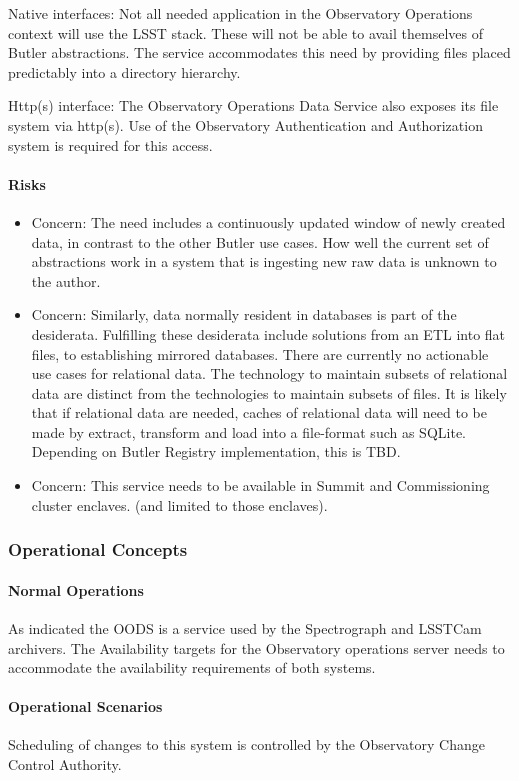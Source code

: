 Native interfaces: Not all needed application in the Observatory Operations context
will use the LSST stack. These will not be able to avail themselves of Butler abstractions.
The service accommodates this need by providing files placed predictably into a
directory hierarchy.

Http(s) interface: The Observatory Operations Data Service also exposes its
file system via http(s). Use of the Observatory Authentication and Authorization
system is required for this access.

\paragraph{Risks}

\begin{itemize}

\item Concern: The need includes a continuously updated window of newly created
data, in contrast to the other Butler use cases.  How well the current set of
abstractions work in a system that is ingesting new raw data  is unknown to the
author.

\item Concern: Similarly, data normally resident in databases is part of the desiderata.
Fulfilling these desiderata include solutions from an ETL into flat files, to
establishing mirrored databases. There are currently no actionable use cases
for relational data. The technology to maintain subsets of relational data are distinct
from the technologies to maintain subsets of files. It is likely that if relational data are
needed, caches of relational data will need to be made by extract, transform and load
into a file-format such as SQLite. Depending on Butler Registry implementation, this is TBD.  

\item Concern: This service needs to be available in Summit and Commissioning cluster enclaves. (and limited to those enclaves).

\end{itemize}

\subsubsection{Operational Concepts}

\paragraph{Normal Operations}

As indicated the OODS is a service used by the Spectrograph and LSSTCam archivers.
The Availability targets for the
Observatory operations server needs to accommodate the availability requirements of both systems.

\paragraph{Operational Scenarios}

Scheduling of changes to this system is controlled by the Observatory Change Control Authority.
